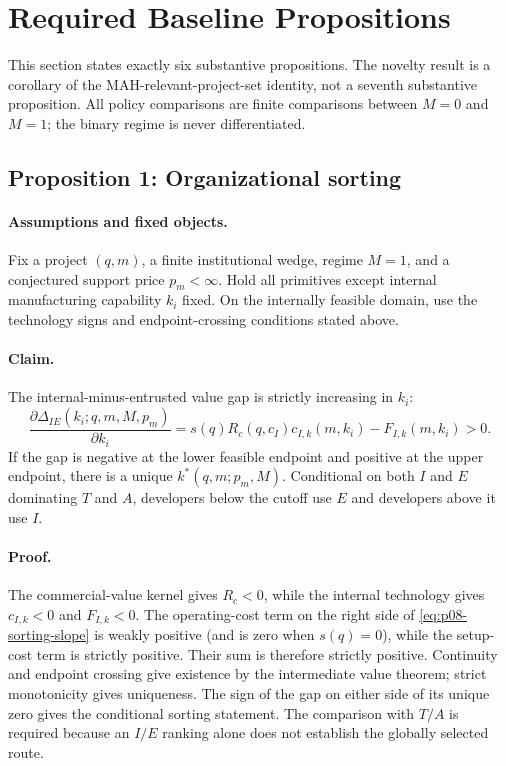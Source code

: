 \section{Required Baseline Propositions}
\label{sec:p08-propositions}

This section states exactly six substantive propositions. The novelty result
is a corollary of the MAH-relevant-project-set identity, not a seventh
substantive proposition. All policy comparisons are finite comparisons between
\(M=0\) and \(M=1\); the binary regime is never differentiated.

\subsection{Proposition 1: Organizational sorting}
\label{prop:p08-sorting}

\paragraph{Assumptions and fixed objects.}
Fix a project \((q,m)\), a finite institutional wedge, regime \(M=1\), and a
conjectured support price \(p_m<\infty\). Hold all primitives except internal
manufacturing capability \(k_i\) fixed. On the internally feasible domain,
use the technology signs and endpoint-crossing conditions stated above.

\paragraph{Claim.}
The internal-minus-entrusted value gap is strictly increasing in \(k_i\):
\begin{equation}
  \frac{\partial\Delta_{IE}(k_i;q,m,M,p_m)}{\partial k_i}
  =
  s(q)R_c(q,c_I)c_{I,k}(m,k_i)-F_{I,k}(m,k_i)
  >0.
  \label{eq:p08-sorting-slope}
\end{equation}
If the gap is negative at the lower feasible endpoint and positive at the
upper endpoint, there is a unique \(k^*(q,m;p_m,M)\). Conditional on both
\(I\) and \(E\) dominating \(T\) and \(A\), developers below the cutoff use
\(E\) and developers above it use \(I\).

\paragraph{Proof.}
The commercial-value kernel gives \(R_c<0\), while the internal technology
gives \(c_{I,k}<0\) and \(F_{I,k}<0\).
The operating-cost term on the right side of
\eqref{eq:p08-sorting-slope} is weakly positive (and is zero when
\(s(q)=0\)), while the setup-cost term is strictly positive. Their sum is
therefore strictly positive. Continuity and endpoint crossing give existence
by the intermediate value theorem; strict monotonicity gives uniqueness. The sign of
the gap on either side of its unique zero gives the conditional sorting
statement. The comparison with \(T/A\) is required because an \(I/E\) ranking
alone does not establish the globally selected route.

